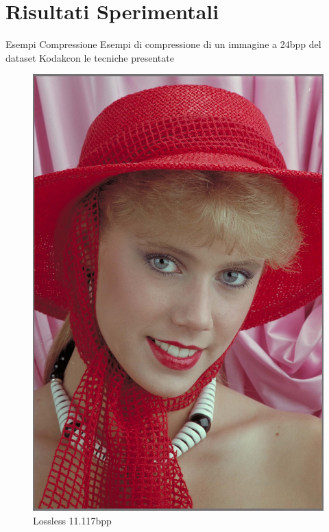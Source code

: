 \section{Risultati Sperimentali}

    \begin{frame}{Esempi Compressione}
        Esempi di compressione di un immagine a 24bpp del dataset Kodak\footnotemark[1] con le tecniche presentate\\
        \begin{figure}[!ht]
            \begin{minipage}[]{0.13\linewidth}
                \centering
                \includegraphics[width=\textwidth]{Immagini/IMAGES/PNG_IMG0004.pdf}
                \caption{Lossless 11.117bpp}
                \label{fig:Lossless}

\end{minipage}
\end{figure}
\end{frame}
